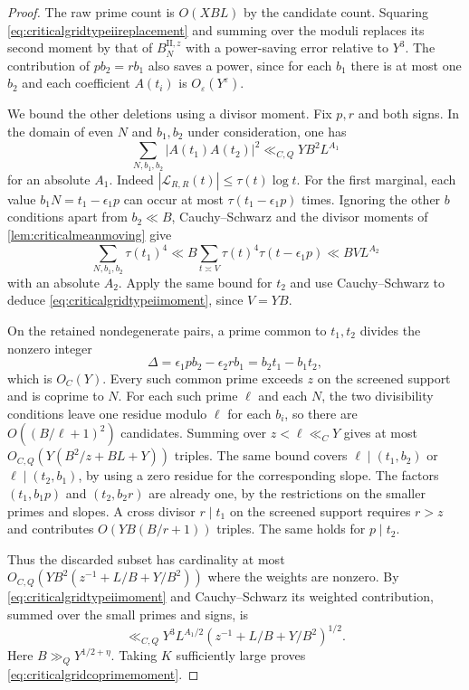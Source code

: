 \documentclass[11pt,a4paper]{article}
\numberwithin{equation}{section}
\begin{document}
\begin{proof}
The raw prime count is $O(XBL)$ by the candidate count.
Squaring \cref{eq:criticalgridtypeiireplacement} and
summing over the moduli replaces its second moment by
that of $B_N^{\mathrm{II},z}$ with a power-saving error
relative to $Y^3$. The contribution of $p b_2=r b_1$
also saves a power, since for each $b_1$ there is
at most one $b_2$ and each coefficient $A(t_i)$ is
$O_\varepsilon(Y^\varepsilon)$.

We bound the other deletions using a divisor moment.
Fix $p,r$ and both signs. In the domain of even $N$
and $b_1,b_2$ under consideration, one has
\begin{equation}
 \sum_{N,b_1,b_2}|A(t_1)A(t_2)|^2
                 \ll_{C,Q} YB^2 L^{A_1}
 \label{eq:criticalgridtypeiimoment}
\end{equation}
for an absolute $A_1$. Indeed
$|\mathcal L_{R,R}(t)|\le\tau(t)\log t$. For the
first marginal, each value $b_1N=t_1-\epsilon_1p$
can occur at most $\tau(t_1-\epsilon_1p)$ times.
Ignoring the other $b$ conditions apart from
$b_2\ll B$, Cauchy--Schwarz and the divisor moments
of \cref{lem:criticalmeanmoving} give
\[
 \sum_{N,b_1,b_2}\tau(t_1)^4
 \ll B\sum_{t\asymp V}\tau(t)^4\tau(t-\epsilon_1p)
 \ll BV L^{A_2}
\]
with an absolute $A_2$. Apply the same bound for
$t_2$ and use Cauchy--Schwarz to deduce
\cref{eq:criticalgridtypeiimoment}, since $V=YB$.

On the retained nondegenerate pairs, a prime common
to $t_1,t_2$ divides the nonzero integer
\[
 \Delta=\epsilon_1p b_2-\epsilon_2r b_1
                = b_2t_1-b_1t_2 ,
\]
which is $O_C(Y)$. Every such common prime exceeds
$z$ on the screened support and is coprime to $N$.
For each such prime $\ell$ and each $N$, the two
divisibility conditions leave one residue modulo
$\ell$ for each $b_i$, so there are
$O((B/\ell+1)^2)$ candidates. Summing over
$z<\ell\ll_C Y$ gives at most
$O_{C,Q}(Y(B^2/z+BL+Y))$ triples.
The same bound covers $\ell\mid(t_1,b_2)$ or
$\ell\mid(t_2,b_1)$, by using a zero residue for
the corresponding slope. The factors $(t_1,b_1p)$
and $(t_2,b_2r)$ are already one, by the restrictions
on the smaller primes and slopes. A cross divisor
$r\mid t_1$ on the screened support requires $r>z$
and contributes $O(YB(B/r+1))$ triples. The same
holds for $p\mid t_2$.

Thus the discarded subset has cardinality at most
$O_{C,Q}(YB^2(z^{-1}+L/B+Y/B^2))$ where the weights
are nonzero. By \cref{eq:criticalgridtypeiimoment}
and Cauchy--Schwarz its weighted contribution,
summed over the small primes and signs, is
\[
 \ll_{C,Q} Y^3 L^{A_1/2}
               (z^{-1}+L/B+Y/B^2)^{1/2}.
\]
Here $B\gg_Q Y^{1/2+\eta}$. Taking $K$ sufficiently
large proves \cref{eq:criticalgridcoprimemoment}.


\end{proof}
\end{document}
